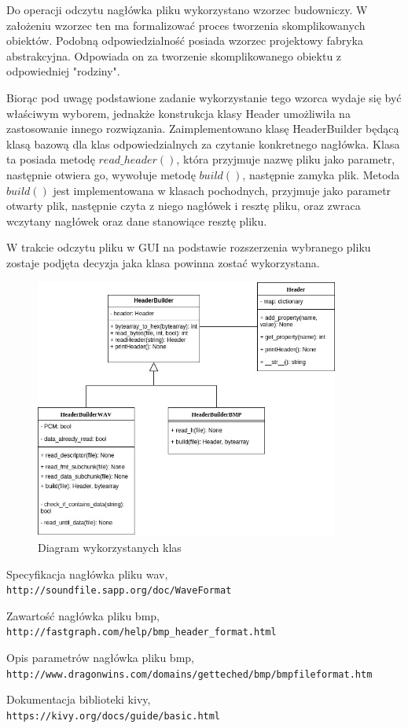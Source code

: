 \documentclass{article}
\begin{document}
Do operacji odczytu nagłówka pliku wykorzystano wzorzec budowniczy. W założeniu wzorzec ten ma formalizować proces tworzenia skomplikowanych obiektów. Podobną odpowiedzialność posiada wzorzec projektowy fabryka abstrakcyjna. Odpowiada on za tworzenie skomplikowanego obiektu z odpowiedniej "rodziny". 

Biorąc pod uwagę podstawione zadanie wykorzystanie tego wzorca wydaje się być właściwym wyborem, jednakże konstrukcja klasy Header umożliwiła na zastosowanie innego rozwiązania. Zaimplementowano klasę HeaderBuilder będącą klasą bazową dla klas odpowiedzialnych za czytanie konkretnego  nagłówka. Klasa ta posiada metodę $read\_header()$, która przyjmuje nazwę pliku jako parametr, następnie otwiera go, wywołuje metodę $build()$, następnie zamyka plik. Metoda $build()$ jest implementowana w klasach pochodnych, przyjmuje jako parametr otwarty plik, następnie czyta z niego nagłówek i resztę pliku, oraz zwraca wczytany nagłówek oraz dane stanowiące resztę pliku.

W trakcie odczytu pliku w GUI na podstawie rozszerzenia wybranego pliku zostaje podjęta decyzja jaka klasa powinna zostać wykorzystana.

\begin{figure} 
\centering
\includegraphics[width=10cm]{Untitled_Diagram.jpg}
\caption{Diagram wykorzystanych klas}
\end{figure}


\newpage
\begin{thebibliography}{9}

Specyfikacja nagłówka pliku wav,
\\\texttt{http://soundfile.sapp.org/doc/WaveFormat}

Zawartość nagłówka pliku bmp,
\\\texttt{http://fastgraph.com/help/bmp\_header\_format.html}

Opis parametrów nagłówka pliku bmp,
\\\texttt{http://www.dragonwins.com/domains/getteched/bmp/bmpfileformat.htm}

Dokumentacja biblioteki kivy,
\\\texttt{https://kivy.org/docs/guide/basic.html}

\end{thebibliography}
\end{document}
